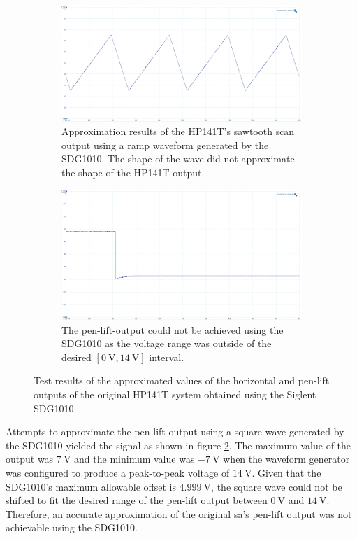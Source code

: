 \documentclass[class=report,11pt,crop=false]{standalone}
\begin{document}
	\begin{figure}[h!]
		\centering
		\begin{subfigure}{.48\textwidth}
			\centering
			\includegraphics[width=0.95\linewidth]{Figures/Results/hp141t-sawtooth-test}
			\caption{Approximation results of the HP141T's sawtooth scan output using a ramp waveform generated by the SDG1010. The shape of the wave did not approximate the shape of the HP141T output.}
			\label{fig:hp141t-sawtooth-test}
		\end{subfigure}%
		\begin{subfigure}{.48\textwidth}
			\centering
			\includegraphics[width=0.95\linewidth]{Figures/Results/hp141t-penlift-test}
			\caption{The pen-lift-output could not be achieved using the SDG1010 as the voltage range was outside of the desired $[\SI{0}{\volt}, \SI{14}{\volt}]$ interval.}
			\label{fig:hp141t-penlift-test}
		\end{subfigure}
		\caption{Test results of the approximated values of the horizontal and pen-lift outputs of the original HP141T system obtained using the Siglent SDG1010.}
		\label{fig:hp141t-horpen-test-results}
	\end{figure} 

	Attempts to approximate the pen-lift output using a square wave generated by the SDG1010 yielded the signal as shown in figure \ref{fig:hp141t-penlift-test}. The maximum value of the output was $\SI{7}{\volt}$ and the minimum value was $\SI{-7}{\volt}$ when the waveform generator was configured to produce a peak-to-peak voltage of $\SI{14}{\volt}$. Given that the SDG1010's maximum allowable offset is $\SI{4.999}{\volt}$, the square wave could not be shifted to fit the desired range of the pen-lift output between $\SI{0}{\volt}$ and $\SI{14}{\volt}$. Therefore, an accurate approximation of the original \acrshort{sa}'s pen-lift output was not achievable using the SDG1010. 
	
\end{document}
